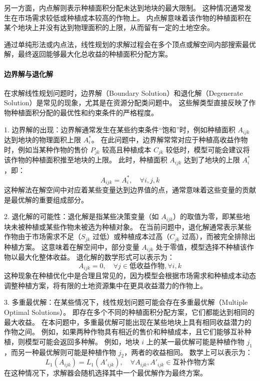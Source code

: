 \documentclass[12pt,a4paper]{nmmcm}
\begin{document}
另一方面，内点解则表示种植面积分配未达到地块的最大限制。
这种情况通常发生在市场需求较低或种植成本较高的作物上。
内点解意味着该作物的种植面积在某个地块上并没有达到物理面积的上限，从而留有一定的土地空余。


通过单纯形法或内点法，线性规划的求解过程会在多个顶点或解空间内部搜索最优解，最终返回能够最大化总收益的种植面积分配方案。


\paragraph{边界解与退化解}

在求解线性规划问题时，边界解（Boundary Solution）和退化解（Degenerate Solution）是常见的现象，尤其是在资源分配类问题中。
这些解类型直接反映了作物种植面积分配的最优性和约束条件的严格程度。


1. 边界解的出现：边界解通常发生在某些约束条件“饱和”时，例如种植面积 $A_{ijk}$ 达到地块的物理面积上限 $A_i^*$。
在此问题中，边界解常常对应于种植高收益作物时，例如当某种作物的售价 $P_{jk}$ 较高且种植成本 $C_{jk}$ 较低时，模型可能会建议将该作物的种植面积推至地块的上限。
此时，种植面积 $A_{ijk}$ 达到了地块的上限 $A_i^*$，即：
\[
  A_{ijk} = A_i^*, \quad \forall i, j, k
\]
这种解法在解空间中对应着某些变量达到边界值的点，通常意味着这些变量的贡献是最优解的重要组成部分。


2. 退化解的可能性：退化解是指某些决策变量（如 $A_{ijk}$）的取值为零，即某些地块未被种植或某些作物未被选为种植对象。
在当前问题中，退化解通常表示某些作物由于市场需求不足（$S_{jk}$ 过低）或种植成本过高（$C_{jk}$ 过高），而被完全排除出种植方案。
这意味着在解空间中，部分变量 $A_{ijk}$ 处于零值，模型选择不种植该作物以最大化整体收益。
退化解的数学形式可以表示为：
\[
  A_{ijk} = 0, \quad \forall j \in \text{低收益作物}, \forall i, k
\]
这种现象在种植优化中是合理且常见的，因为模型会根据市场需求和种植成本动态调整种植方案，将有限的土地资源集中在更具收益潜力的作物上。


3. 多重最优解：在某些情况下，线性规划问题可能会存在多重最优解（Multiple Optimal Solutions）。
即存在多个不同的种植面积分配方案，它们都能达到相同的最大收益。
在本问题中，多重最优解可能出现在某些地块上具有相同收益潜力的作物之间。
例如，如果两种作物具有相近的售价和种植成本，且它们能够互补种植，则模型可能会返回多种解。
例如，地块 $i$ 上的某一最优解可能是种植作物 $j_1$，而另一种最优解则可能是种植作物 $j_2$，两者的收益相同。
数学上可以表示为：
\[
  L_1(A_{ijk}) = L_1(A'_{ijk}), \quad \forall A_{ijk}, A'_{ijk} \in \text{互补作物方案}
\]
在这种情况下，求解器会随机选择其中一个最优解作为最终方案。
\end{document}
